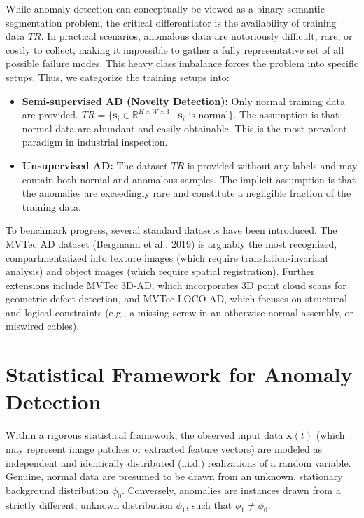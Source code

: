 \begin{insightbox}
While anomaly detection can conceptually be viewed as a binary semantic segmentation problem, the critical differentiator is the availability of training data $TR$. In practical scenarios, anomalous data are notoriously difficult, rare, or costly to collect, making it impossible to gather a fully representative set of all possible failure modes. This heavy class imbalance forces the problem into specific setups. Thus, we categorize the training setups into:
\begin{itemize}
    \item \textbf{Semi-supervised AD (Novelty Detection):} Only normal training data are provided. $TR = \{\boldsymbol{s}_i \in \mathbb{R}^{H \times W \times 3} \mid \boldsymbol{s}_i \text{ is normal}\}$. The assumption is that normal data are abundant and easily obtainable. This is the most prevalent paradigm in industrial inspection.
    \item \textbf{Unsupervised AD:} The dataset $TR$ is provided without any labels and may contain both normal and anomalous samples. The implicit assumption is that the anomalies are exceedingly rare and constitute a negligible fraction of the training data.
\end{itemize}
\end{insightbox}

To benchmark progress, several standard datasets have been introduced. The MVTec AD dataset (Bergmann et al., 2019) is arguably the most recognized, compartmentalized into texture images (which require translation-invariant analysis) and object images (which require spatial registration). Further extensions include MVTec 3D-AD, which incorporates 3D point cloud scans for geometric defect detection, and MVTec LOCO AD, which focuses on structural and logical constraints (e.g., a missing screw in an otherwise normal assembly, or miswired cables).

\section{Statistical Framework for Anomaly Detection}
Within a rigorous statistical framework, the observed input data $\boldsymbol{x}(t)$ (which may represent image patches or extracted feature vectors) are modeled as independent and identically distributed (i.i.d.) realizations of a random variable. Genuine, normal data are presumed to be drawn from an unknown, stationary background distribution $\phi_0$. Conversely, anomalies are instances drawn from a strictly different, unknown distribution $\phi_1$, such that $\phi_1 \neq \phi_0$.

